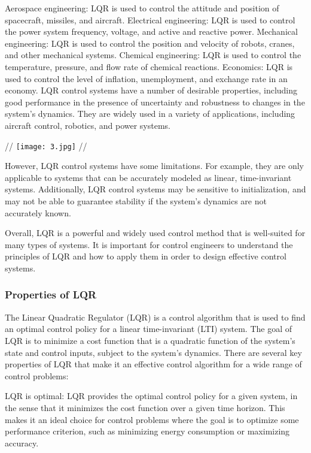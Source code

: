 \documentclass[12pt]{article}
\begin{document}
Aerospace engineering: LQR is used to control the attitude and position of spacecraft, missiles, and aircraft. Electrical engineering: LQR is used to control the power system frequency, voltage, and active and reactive power. Mechanical engineering: LQR is used to control the position and velocity of robots, cranes, and other mechanical systems. Chemical engineering: LQR is used to control the temperature, pressure, and flow rate of chemical reactions. Economics: LQR is used to control the level of inflation, unemployment, and exchange rate in an economy.
LQR control systems have a number of desirable properties, including good performance in the presence of uncertainty and robustness to changes in the system's dynamics. They are widely used in a variety of applications, including aircraft control, robotics, and power systems.


//
\texttt{[image: 3.jpg]}
//


However, LQR control systems have some limitations. For example, they are only applicable to systems that can be accurately modeled as linear, time-invariant systems. Additionally, LQR control systems may be sensitive to initialization, and may not be able to guarantee stability if the system's dynamics are not accurately known.

Overall, LQR is a powerful and widely used control method that is well-suited for many types of systems. It is important for control engineers to understand the principles of LQR and how to apply them in order to design effective control systems.
\subsubsection*{Properties of LQR}
The Linear Quadratic Regulator (LQR) is a control algorithm that is used to find an optimal control policy for a linear time-invariant (LTI) system. The goal of LQR is to minimize a cost function that is a quadratic function of the system's state and control inputs, subject to the system's dynamics. There are several key properties of LQR that make it an effective control algorithm for a wide range of control problems:

LQR is optimal: LQR provides the optimal control policy for a given system, in the sense that it minimizes the cost function over a given time horizon. This makes it an ideal choice for control problems where the goal is to optimize some performance criterion, such as minimizing energy consumption or maximizing accuracy.
\end{document}
